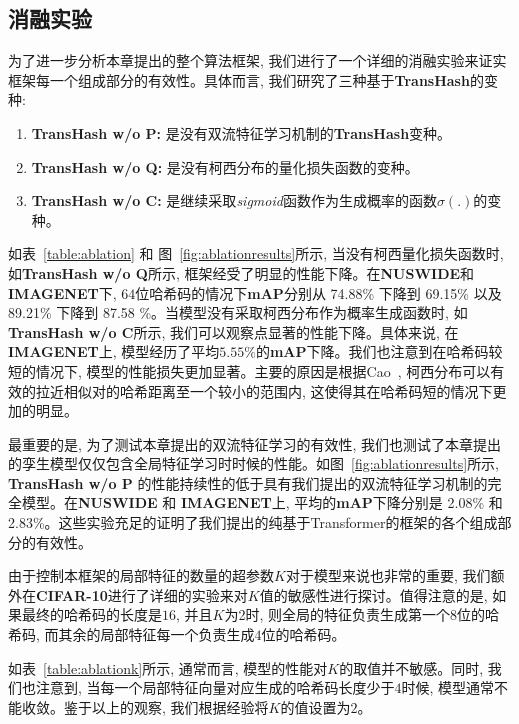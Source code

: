 \subsection{消融实验}
为了进一步分析本章提出的整个算法框架, 我们进行了一个详细的消融实验来证实框架每一个组成部分的有效性。具体而言, 我们研究了三种基于\textbf{TransHash}的变种:
\begin{enumerate}
    \item \textbf{TransHash w/o P:} 是没有双流特征学习机制的\textbf{TransHash}变种。
    \item \textbf{TransHash w/o Q:} 是没有柯西分布的量化损失函数的变种。
    \item \textbf{TransHash w/o C:} 是继续采取\textit{sigmoid}函数作为生成概率的函数$\sigma(.)$的变种。
\end{enumerate}
如表~\ref{table:ablation} 和 图~\ref{fig:ablationresults}所示, 当没有柯西量化损失函数时, 如\textbf{TransHash w/o Q}所示, 框架经受了明显的性能下降。在\textbf{NUSWIDE}和\textbf{IMAGENET}下, $64$位哈希码的情况下\textbf{mAP}分别从 74.88\% 下降到 69.15\% 以及89.21\% 下降到 87.58 \%。当模型没有采取柯西分布作为概率生成函数时, 如\textbf{TransHash w/o C}所示, 我们可以观察点显著的性能下降。具体来说, 在\textbf{IMAGENET}上, 模型经历了平均$5.55 \%$的\textbf{mAP}下降。我们也注意到在哈希码较短的情况下, 模型的性能损失更加显著。主要的原因是根据Cao~\cite{cao2018deep}, 柯西分布可以有效的拉近相似对的哈希距离至一个较小的范围内, 这使得其在哈希码短的情况下更加的明显。\par



最重要的是, 为了测试本章提出的双流特征学习的有效性, 我们也测试了本章提出的孪生模型仅仅包含全局特征学习时时候的性能。如图~\ref{fig:ablationresults}所示,  \textbf{TransHash w/o P} 的性能持续性的低于具有我们提出的双流特征学习机制的完全模型。在\textbf{NUSWIDE} 和 \textbf{IMAGENET}上, 平均的\textbf{mAP}下降分别是  2.08\% 和 2.83\%。这些实验充足的证明了我们提出的纯基于Transformer的框架的各个组成部分的有效性。\par
由于控制本框架的局部特征的数量的超参数$K$对于模型来说也非常的重要, 我们额外在\textbf{CIFAR-10}进行了详细的实验来对$K$值的敏感性进行探讨。值得注意的是, 如果最终的哈希码的长度是$16$, 并且$K$为2时, 则全局的特征负责生成第一个$8$位的哈希码, 而其余的局部特征每一个负责生成$4$位的哈希码。 \par
如表~\ref{table:ablationk}所示, 通常而言, 模型的性能对$K$的取值并不敏感。同时, 我们也注意到, 当每一个局部特征向量对应生成的哈希码长度少于$4$时候, 模型通常不能收敛。鉴于以上的观察, 我们根据经验将$K$的值设置为$2$。

